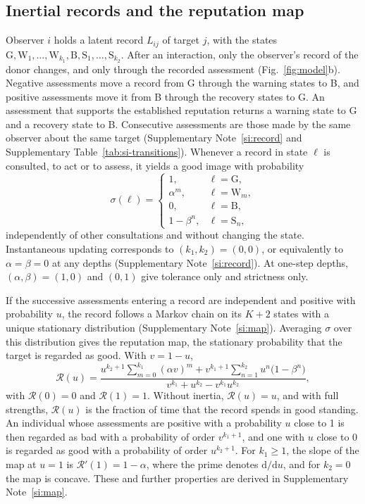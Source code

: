 \documentclass[10pt]{wlscirep}
\newcommand{\Rmap}{\mathscr{R}}            %
\newcommand{\st}[1]{\mathrm{#1}}           %
\newcommand{\dd}{\mathrm{d}}
\theoremstyle{plain}
\theoremstyle{remark}
\begin{document}
\subsection*{Inertial records and the reputation map}

Observer $i$ holds a latent record $L_{ij}$ of target $j$, with the states $\st G,\st W_1,\ldots,\st W_{k_1},\st B,\st S_1,\ldots,\st S_{k_2}$. After an interaction, only the observer's record of the donor changes, and only through the recorded assessment (Fig.~\ref{fig:model}b). Negative assessments move a record from G through the warning states to B, and positive assessments move it from B through the recovery states to G. An assessment that supports the established reputation returns a warning state to G and a recovery state to B. Consecutive assessments are those made by the same observer about the same target (Supplementary Note~\ref{si:record} and Supplementary Table~\ref{tab:si-transitions}). Whenever a record in state $\ell$ is consulted, to act or to assess, it yields a good image with probability
\begin{equation}
\sigma(\ell)=
\begin{cases}
1, & \ell=\st G,\\
\alpha^m, & \ell=\st W_m,\\
0, & \ell=\st B,\\
1-\beta^n, & \ell=\st S_n,
\end{cases}
\label{eq:m-readout}
\end{equation}
independently of other consultations and without changing the state. Instantaneous updating corresponds to $(k_1,k_2)=(0,0)$, or equivalently to $\alpha=\beta=0$ at any depths (Supplementary Note~\ref{si:record}). At one-step depths, $(\alpha,\beta)=(1,0)$ and $(0,1)$ give tolerance only and strictness only.

If the successive assessments entering a record are independent and positive with probability $u$, the record follows a Markov chain on its $K+2$ states with a unique stationary distribution (Supplementary Note~\ref{si:map}). Averaging $\sigma$ over this distribution gives the reputation map, the stationary probability that the target is regarded as good. With $v=1-u$,
\begin{equation}
\Rmap(u)=\frac{u^{k_2+1}\sum_{m=0}^{k_1}(\alpha v)^m+v^{k_1+1}\sum_{n=1}^{k_2}u^n\bigl(1-\beta^n\bigr)}{v^{k_1}+u^{k_2}-v^{k_1}u^{k_2}},
\label{eq:m-map}
\end{equation}
with $\Rmap(0)=0$ and $\Rmap(1)=1$. Without inertia, $\Rmap(u)=u$, and with full strengths, $\Rmap(u)$ is the fraction of time that the record spends in good standing. An individual whose assessments are positive with a probability $u$ close to 1 is then regarded as bad with a probability of order $v^{k_1+1}$, and one with $u$ close to 0 is regarded as good with a probability of order $u^{k_2+1}$. For $k_1\geq1$, the slope of the map at $u=1$ is $\Rmap'(1)=1-\alpha$, where the prime denotes $\dd/\dd u$, and for $k_2=0$ the map is concave. These and further properties are derived in Supplementary Note~\ref{si:map}.
\end{document}
